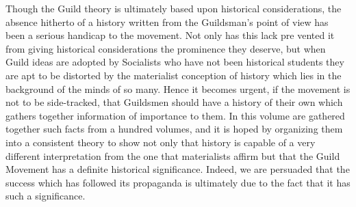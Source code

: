 \documentclass{book}
\begin{document}
Though the Guild theory is ultimately based upon historical considerations, the absence hitherto of a history written from the Guildsman’s point of view has been a serious handicap to the movement. Not only has this lack pre vented it from giving historical considerations the prominence they deserve, but when Guild ideas are adopted by Socialists who have not been historical students they are apt to be distorted by the materialist conception of history which lies in the background of the minds of so many. Hence it becomes urgent, if the movement is not to be side-tracked, that Guildsmen should have a history of their own which gathers together information of importance to them. In this volume are gathered together such facts from a hundred volumes, and it is hoped by organizing them into a consistent theory to show not only that history is capable of a very different interpretation from the one that materialists affirm but that the Guild Movement has a definite historical significance. Indeed, we are persuaded that the success which has followed its propaganda is ultimately due to the fact that it has such a significance.
\end{document}

